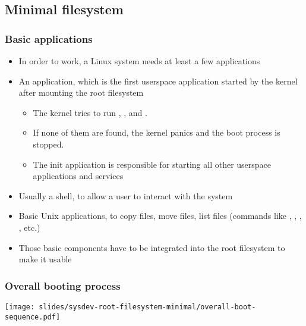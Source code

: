 \subsection{Minimal filesystem}
\begin{frame}
  \frametitle{Basic applications}
  \begin{itemize}
  \item In order to work, a Linux system needs at least a few
    applications
  \item An  application, which is the first userspace
    application started by the kernel after mounting the root
    filesystem
    \begin{itemize}
    \item The kernel tries to run , ,
       and .
    \item If none of them are found, the kernel panics and the boot
      process is stopped.
    \item The init application is responsible for starting all other
      userspace applications and services
    \end{itemize}
  \item Usually a shell, to allow a user to interact with the system
  \item Basic Unix applications, to copy files, move files, list files
    (commands like , , , ,
    etc.)
  \item Those basic components have to be integrated into the root
    filesystem to make it usable
  \end{itemize}
\end{frame}

\begin{frame}
  \frametitle{Overall booting process}
  \begin{center}
    \texttt{[image: slides/sysdev-root-filesystem-minimal/overall-boot-sequence.pdf]}
  \end{center}
\end{frame}

